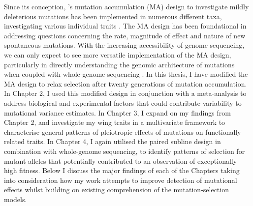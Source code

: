 Since its conception, \citet{Muka64}’s mutation accumulation (MA) design to investigate mildly deleterious mutations has been implemented in numerous different taxa, investigating various individual traits \citep{Houl96, Hall09, Wals18}. The MA design has been foundational in addressing questions concerning the rate, magnitude of effect and nature of new spontaneous mutations. With the increasing accessibility of genome sequencing, we can only expect to see more versatile implementation of the MA design, particularly in directly understanding the genomic architecture of mutations when coupled with whole-genome sequencing \citep{Katj19}. In this thesis, I have modified the MA design to relax selection after twenty generations of mutation accumulation. In Chapter 2, I used this modified design in conjunction with a meta-analysis to address biological and experimental factors that could contribute variability to mutational variance estimates. In Chapter 3, I expand on my findings from Chapter 2, and investigate my wing traits in a multivariate framework to characterise general patterns of pleiotropic effects of mutations on functionally related traits. In Chapter 4, I again utilised the paired subline design in combination with whole-genome sequencing, to identify patterns of selection for mutant alleles that potentially contributed to an observation of exceptionally high fitness. Below I discuss the major findings of each of the Chapters taking into consideration how my work attempts to improve detection of mutational effects whilst building on existing comprehension of the mutation-selection models. \par

